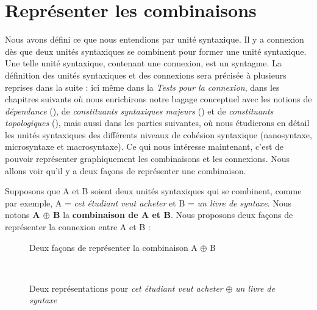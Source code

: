 \section{Représenter les combinaisons}\label{sec:3.2.12}

Nous avons défini ce que nous entendions par unité syntaxique. Il y a connexion dès que deux unités syntaxiques se combinent pour former une unité syntaxique. Une telle unité syntaxique, contenant une connexion, est un syntagme. La définition des unités syntaxiques et des connexions sera précisée à plusieurs reprises dans la suite : ici même dans la  \textit{Tests pour la connexion}, dans les chapitres suivants où nous enrichirons notre bagage conceptuel avec les notions de \textit{dépendance} (), de \textit{constituants syntaxiques majeurs} () et de \textit{constituants topologiques} (), mais aussi dans les parties suivantes, où nous étudierons en détail les unités syntaxiques des différents niveaux de cohésion syntaxique (nanosyntaxe, microsyntaxe et macrosyntaxe). Ce qui nous intéresse maintenant, c’est de pouvoir représenter graphiquement les combinaisons et les connexions. Nous allons voir qu’il y a deux façons de représenter une combinaison.

Supposons que A et B soient deux unités syntaxiques qui se combinent, comme par exemple, A = \textit{cet étudiant veut acheter} et B = \textit{un livre de syntaxe}. Nous notons \textbf{A ${\oplus}$ B} la \textbf{combinaison de A et B}. Nous proposons deux façons de représenter la connexion entre A et B :

\begin{figure}
\caption{\label{fig:}Deux façons de représenter la combinaison A $\oplus$ B}
\end{figure}

\begin{figure}
\medskip\\
\caption{\label{fig:}Deux représentations pour \textit{cet étudiant veut acheter} $\oplus$ \textit{un livre de syntaxe}}
\end{figure}

